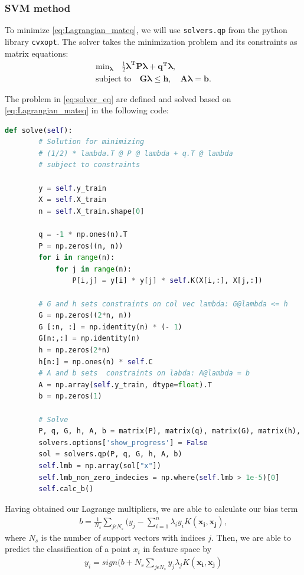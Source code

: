 \subsubsection{SVM method}
\label{sec:SVM_method}
To minimize \autoref{eq:Lagrangian_mateq}, we will use \verb|solvers.qp| from
the python library \verb|cvxopt|. The solver takes the minimization problem 
and its constraints as matrix equations:
\begin{equation}
	\begin{split}
		\text{min}_{\boldsymbol{\lambda }}\quad \frac{1}{2}\boldsymbol{\lambda ^TP\lambda +q^T\lambda },\\
	\text{subject to}\quad \boldsymbol{G \lambda  \le h}, \quad \boldsymbol{A \lambda =b}.
	\end{split}
	\label{eq:solver_eq}
\end{equation}

The problem in \autoref{eq:solver_eq} are defined and solved based on \autoref{eq:Lagrangian_mateq}
in the following code:
\begin{lstlisting}[language=Python]
def solve(self):
        # Solution for minimizing 
        # (1/2) * lambda.T @ P @ lambda + q.T @ lambda 
        # subject to constraints

        y = self.y_train
        X = self.X_train
        n = self.X_train.shape[0]

        q = -1 * np.ones(n).T
        P = np.zeros((n, n))
        for i in range(n):
            for j in range(n):
                P[i,j] = y[i] * y[j] * self.K(X[i,:], X[j,:])
        
        # G and h sets constraints on col vec lambda: G@lambda <= h
        G = np.zeros((2*n, n))
        G [:n, :] = np.identity(n) * (- 1)
        G[n:,:] = np.identity(n)
        h = np.zeros(2*n)
        h[n:] = np.ones(n) * self.C
        # A and b sets  constraints on labda: A@lambda = b
        A = np.array(self.y_train, dtype=float).T
        b = np.zeros(1) 
    
        # Solve 
        P, q, G, h, A, b = matrix(P), matrix(q), matrix(G), matrix(h), matrix(A), matrix(b)
        solvers.options['show_progress'] = False
        sol = solvers.qp(P, q, G, h, A, b)
        self.lmb = np.array(sol["x"])
        self.lmb_non_zero_indecies = np.where(self.lmb > 1e-5)[0]
        self.calc_b()
\end{lstlisting}

Having obtained our Lagrange multipliers, we are able to calculate our bias term 
\begin{gather*}
b = \frac{1}{N_s}\sum_{j\epsilon N_s} (y_j-\sum_{i=1}^{n} \lambda _i y_i K(\boldsymbol{x_i,x_j}),
\end{gather*}
where $N_s$ is the number of support vectors with indices $j$.
Then, we are able to predict the classification of a point $x_i$ in feature space by 
\begin{gather*}
y_i = sign(b + {N_s}\sum_{j\epsilon N_s} y_j \lambda _j K(\boldsymbol{x_i,x_j})
\end{gather*}

